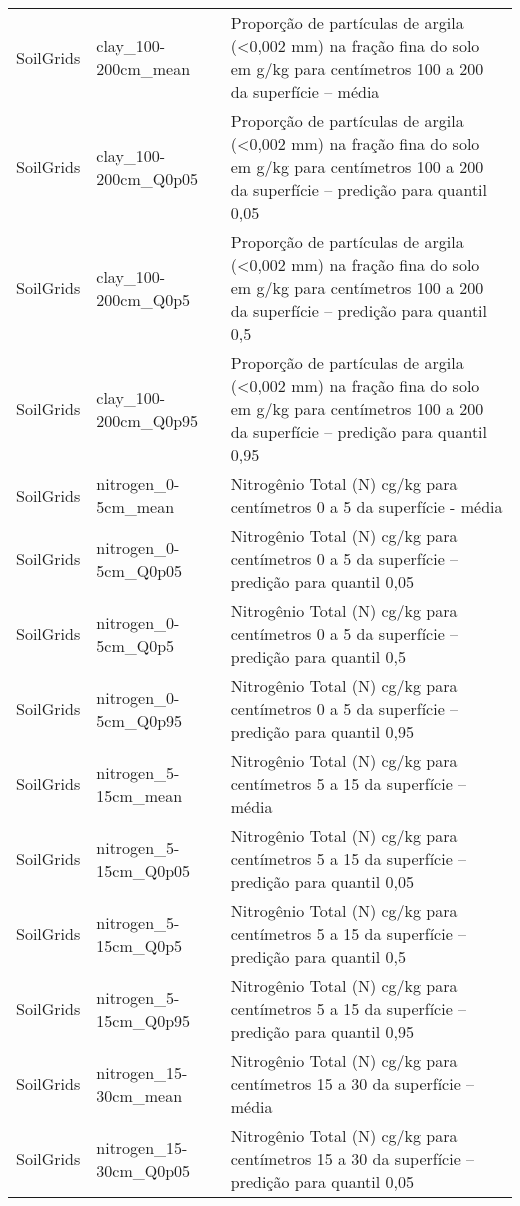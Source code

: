 \begin{longtable}{@{} p{4cm} p{4cm} p{8cm} @{}}
	SoilGrids &
	clay\_100-200cm\_mean &
	Proporção de partículas de argila (\textless 0,002 mm) na fração fina do solo em g/kg para centímetros 100 a 200 da superfície – média \\
	SoilGrids &
	clay\_100-200cm\_Q0p05 &
	Proporção de partículas de argila (\textless 0,002 mm) na fração fina do solo em g/kg para centímetros 100 a 200 da superfície – predição para quantil 0,05 \\
	SoilGrids &
	clay\_100-200cm\_Q0p5 &
	Proporção de partículas de argila (\textless 0,002 mm) na fração fina do solo em g/kg para centímetros 100 a 200 da superfície – predição para quantil 0,5 \\
	SoilGrids &
	clay\_100-200cm\_Q0p95 &
	Proporção de partículas de argila (\textless 0,002 mm) na fração fina do solo em g/kg para centímetros 100 a 200 da superfície – predição para quantil 0,95 \\
	SoilGrids &
	nitrogen\_0-5cm\_mean &
	Nitrogênio Total (N) cg/kg  para centímetros 0 a 5 da superfície - média \\
	SoilGrids &
	nitrogen\_0-5cm\_Q0p05 &
	Nitrogênio Total (N) cg/kg  para centímetros 0 a 5 da superfície – predição para quantil 0,05 \\
	SoilGrids &
	nitrogen\_0-5cm\_Q0p5 &
	Nitrogênio Total (N) cg/kg  para centímetros 0 a 5 da superfície – predição para quantil 0,5 \\
	SoilGrids &
	nitrogen\_0-5cm\_Q0p95 &
	Nitrogênio Total (N) cg/kg  para centímetros 0 a 5 da superfície – predição para quantil 0,95 \\
	SoilGrids &
	nitrogen\_5-15cm\_mean &
	Nitrogênio Total (N) cg/kg  para centímetros 5 a 15 da superfície – média \\
	SoilGrids &
	nitrogen\_5-15cm\_Q0p05 &
	Nitrogênio Total (N) cg/kg  para centímetros 5 a 15 da superfície – predição para quantil 0,05 \\
	SoilGrids &
	nitrogen\_5-15cm\_Q0p5 &
	Nitrogênio Total (N) cg/kg  para centímetros 5 a 15 da superfície – predição para quantil 0,5 \\
	SoilGrids &
	nitrogen\_5-15cm\_Q0p95 &
	Nitrogênio Total (N) cg/kg  para centímetros 5 a 15 da superfície – predição para quantil 0,95 \\
	SoilGrids &
	nitrogen\_15-30cm\_mean &
	Nitrogênio Total (N) cg/kg  para centímetros 15 a 30 da superfície – média \\
	SoilGrids &
	nitrogen\_15-30cm\_Q0p05 &
	Nitrogênio Total (N) cg/kg  para centímetros 15 a 30 da superfície – predição para quantil 0,05 \\

\end{longtable}
